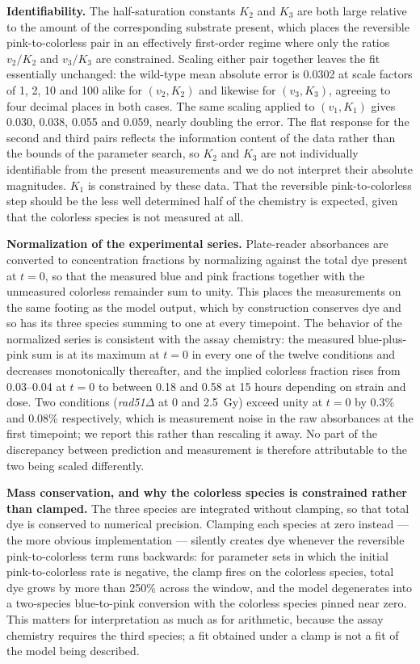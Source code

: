 \documentclass[11pt]{article}
\begin{document}
\textbf{Identifiability.} The half-saturation constants $K_2$ and $K_3$ are both
large relative to the amount of the corresponding substrate present, which places
the reversible pink-to-colorless pair in an effectively first-order regime where
only the ratios $v_2/K_2$ and $v_3/K_3$ are constrained. Scaling either pair
together leaves the fit essentially unchanged: the wild-type mean absolute error is
0.0302 at scale factors of 1, 2, 10 and 100 alike for $(v_2, K_2)$ and likewise
for $(v_3, K_3)$, agreeing to four decimal places in both cases. The same scaling
applied to $(v_1, K_1)$ gives 0.030, 0.038, 0.055 and 0.059, nearly doubling the
error. The flat response for the second and third pairs reflects the information
content of the data rather than the bounds of the parameter search, so $K_2$ and
$K_3$ are not individually identifiable from the present measurements and we do
not interpret their absolute magnitudes. $K_1$ is constrained by these data. That
the reversible pink-to-colorless step should be the less well determined half of
the chemistry is expected, given that the colorless species is not measured at
all.

\textbf{Normalization of the experimental series.} Plate-reader absorbances are
converted to concentration fractions by normalizing against the total dye present
at $t = 0$, so that the measured blue and pink fractions together with the
unmeasured colorless remainder sum to unity. This places the measurements on the
same footing as the model output, which by construction conserves dye and so has
its three species summing to one at every timepoint. The behavior of the
normalized series is consistent with the assay chemistry: the measured
blue-plus-pink sum is at its maximum at $t = 0$ in every one of the twelve
conditions and decreases monotonically thereafter, and the implied colorless
fraction rises from 0.03--0.04 at $t = 0$ to between 0.18 and 0.58 at 15 hours
depending on strain and dose. Two conditions (\textit{rad51}$\Delta$ at 0 and
2.5~Gy) exceed unity at $t = 0$ by 0.3\% and 0.08\% respectively, which is
measurement noise in the raw absorbances at the first timepoint; we report this
rather than rescaling it away. No part of the discrepancy between prediction and
measurement is therefore attributable to the two being scaled differently.

\textbf{Mass conservation, and why the colorless species is constrained rather
than clamped.} The three species are integrated without clamping, so that total
dye is conserved to numerical precision. Clamping each species at zero instead ---
the more obvious implementation --- silently creates dye whenever the reversible
pink-to-colorless term runs backwards: for parameter sets in which the initial
pink-to-colorless rate is negative, the clamp fires on the colorless species,
total dye grows by more than 250\% across the window, and the model degenerates
into a two-species blue-to-pink conversion with the colorless species pinned near
zero. This matters for interpretation as much as for arithmetic, because the assay
chemistry requires the third species; a fit obtained under a clamp is not a fit of
the model being described.
\end{document}
